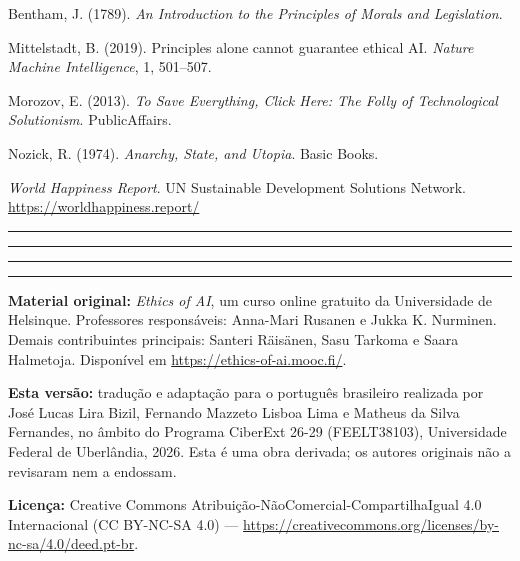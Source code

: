 \documentclass[
  11pt,
]{article}
\newcommand{\faixaEixos}[1][\linewidth]{%
  \noindent
  \textcolor{iaConceitos}{\rule{0.3333#1}{4pt}}%
  \textcolor{iaAplic}{\rule{0.3333#1}{4pt}}%
  \textcolor{iaRiscos}{\rule{0.3333#1}{4pt}}%
  \par}
\newenvironment{licenca}
  {\par\vspace{2em}\faixaEixos\par\vspace{0.8em}
   \begingroup\sffamily\scriptsize\color{iaTintaFraca}}
  {\endgroup\par}
\begin{document}
Bentham, J. (1789). \emph{An Introduction to the Principles of Morals
and Legislation}.

Mittelstadt, B. (2019). Principles alone cannot guarantee ethical AI.
\emph{Nature Machine Intelligence}, 1, 501--507.

Morozov, E. (2013). \emph{To Save Everything, Click Here: The Folly of
Technological Solutionism}. PublicAffairs.

Nozick, R. (1974). \emph{Anarchy, State, and Utopia}. Basic Books.

\emph{World Happiness Report}. UN Sustainable Development Solutions
Network. \url{https://worldhappiness.report/}

\begin{center}\rule{0.5\linewidth}{0.5pt}\end{center}

\begin{licenca}

\textbf{Material original:} \emph{Ethics of AI}, um curso online
gratuito da Universidade de Helsinque. Professores responsáveis:
Anna-Mari Rusanen e Jukka K. Nurminen. Demais contribuintes principais:
Santeri Räisänen, Sasu Tarkoma e Saara Halmetoja. Disponível em
\url{https://ethics-of-ai.mooc.fi/}.

\textbf{Esta versão:} tradução e adaptação para o português brasileiro
realizada por José Lucas Lira Bizil, Fernando Mazzeto Lisboa Lima e
Matheus da Silva Fernandes, no âmbito do Programa CiberExt 26-29
(FEELT38103), Universidade Federal de Uberlândia, 2026. Esta é uma obra
derivada; os autores originais não a revisaram nem a endossam.

\textbf{Licença:} Creative Commons
Atribuição-NãoComercial-CompartilhaIgual 4.0 Internacional (CC BY-NC-SA
4.0) ---
\url{https://creativecommons.org/licenses/by-nc-sa/4.0/deed.pt-br}.

\end{licenca}
\end{document}
